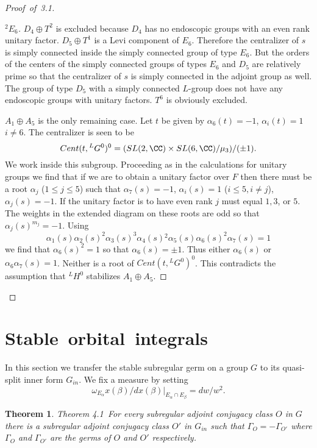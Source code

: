 \documentclass{memo-l}
\newtheorem{theorem}{Theorem}[section]
\theoremstyle{definition}
\theoremstyle{remark}
\numberwithin{section}{chapter}
\numberwithin{equation}{chapter}
\begin{document}
\begin{proof}[Proof\ of\ 3.1]
\begin{proof}[${}^{2}E_{6}$]
   $D_{4}\oplus T^{2}$ is excluded because $D_{4}$ has no endoscopic groups with
an even rank unitary factor.  $D_{5}\oplus T^{1}$ is a Levi component of
$E_{6}$.  Therefore the centralizer of $s$ is simply connected inside the
simply connected group of type $E_{6}$.  But the orders of the centers of
the simply connected groups of types $E_{6}$ and $D_{5}$ are relatively
prime so that the centralizer of $s$ is simply connected in the adjoint
group as well.  The group of type $D_{5}$ with a simply connected $L$-group
does not have any endoscopic groups with unitary factors.  $T^{6}$ is
obviously excluded.

   $A_{1}\oplus A_{5}$ is the only remaining case.  Let $t$ be given by
${\alpha}_{6}(t) = -1$, ${\alpha}_{i}(t) = 1$ $i \ne 6$.  The centralizer is seen to
be
$$
Cent(t,{}^{L}G^{0})^{0}  =  (SL(2,{\CC}) \times 
SL(6,{\CC})/{\mu}_{3})/({\pm}1).
$$
We work inside this subgroup.  Proceeding as in the calculations for
unitary groups we find that if we are to obtain a unitary factor over $F$
then there must be a root ${\alpha}_{j}$ ($1 \le  j \le  5$) such that
${\alpha}_{7}(s)  =  -1$, ${\alpha}_{i}(s)  =  1$ ($i \le  5, i \ne j$),
${\alpha}_{j}(s)  =  -1$.  If the unitary factor is to have even rank $j$ must
equal $1, 3$, or $5$.  The weights in the extended diagram on these roots
are odd so that ${\alpha}_{j}(s)^{m_{j}} =  -1$.  Using
$$
{\alpha}_{1}(s){\alpha}_{2}(s)^{2}{\alpha}_{3}(s)^{3}
{\alpha}_{4}(s){}^{2}{\alpha}_5(s)\alpha_6(s)^2\alpha_7(s)=1
$$
we find that ${\alpha}_{6}(s)^{2}  =  1$ so that ${\alpha}_{6}(s)  = 
{\pm}1$.  Thus either ${\alpha}_{6}(s)$ or ${\alpha}_{6}{\alpha}_{7}(s)
 =  1$.  Neither is a root of $Cent(t,{}^{L}G^{0})^{0}$.  This contradicts the
assumption that ${}^{L}H^{0}$ stabilizes $A_{1}\oplus A_{5}$.
\phantom\qedhere
\end{proof}


\end{proof} 


\section{Stable\ orbital\ integrals}


   In this section we transfer the stable subregular germ on a group $G$ to its
quasi-split inner form $G_{in}$.  We fix a measure by setting
$$
{\omega}_{E_\alpha} x({\beta})/dx({\beta})\vert_{E_{{\alpha}} {\cap}
E_{{\beta}}}  =  dw/w^{2}.
$$

\medpagebreak

\begin{theorem}{Theorem 4.1}\ For every subregular adjoint conjugacy class
$O$ in $G$ there is a subregular adjoint conjugacy class $O'$ in $G_{in}$
such that ${\Gamma}_{O}  =  -{\Gamma}_{O'}$ where ${\Gamma}_{O}$ and
${\Gamma}_{O'}$ are the germs of $O$ and $O'$ respectively.
\end{theorem}
\end{document}
